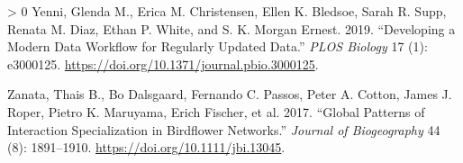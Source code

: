 \documentclass[10pt,oneside]{article}
\newlength{\cslhangindent}
\newenvironment{CSLReferences}[3] %
 {%
  \setlength{\parindent}{0pt}
  \ifodd #1 \everypar{\setlength{\hangindent}{\cslhangindent}}\ignorespaces\fi
  \ifnum #2 > 0
  \setlength{\parskip}{#2\baselineskip}
  \fi
 }%
 {}
\begin{document}
\begin{CSLReferences}{1}{0}
\leavevmode\hypertarget{ref-Yenni2019DevMod}{}%
Yenni, Glenda M., Erica M. Christensen, Ellen K. Bledsoe, Sarah R. Supp,
Renata M. Diaz, Ethan P. White, and S. K. Morgan Ernest. 2019.
{``Developing a Modern Data Workflow for Regularly Updated Data.''}
\emph{PLOS Biology} 17 (1): e3000125.
\url{https://doi.org/10.1371/journal.pbio.3000125}.

\leavevmode\hypertarget{ref-Zanata2017GloPat}{}%
Zanata, Thais B., Bo Dalsgaard, Fernando C. Passos, Peter A. Cotton,
James J. Roper, Pietro K. Maruyama, Erich Fischer, et al. 2017.
{``Global Patterns of Interaction Specialization in Birdflower
Networks.''} \emph{Journal of Biogeography} 44 (8): 1891--1910.
\url{https://doi.org/10.1111/jbi.13045}.

\end{CSLReferences}
\end{document}
